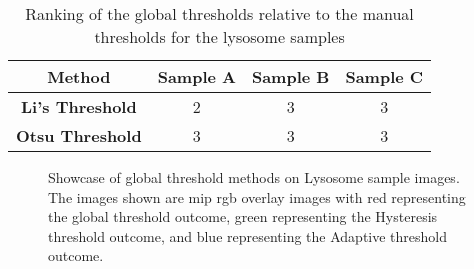 \begin{table}
    \centering
    \begin{tabular}{|c|c|c|c|} \hline 
         \textbf{Method}&  \textbf{Sample A}&  \textbf{Sample B}& \textbf{Sample C}\\ \hline 
         \textbf{Li's Threshold}&  2&  3& 3\\ \hline 
         \textbf{Otsu Threshold}&  3&  3& 3\\ \hline
    \end{tabular}
    \caption{Ranking of the global thresholds relative to the manual thresholds for the lysosome samples}
    \label{tab:global_lyso_rankings}
\end{table}
\begin{figure}[h!]
    \centering
    \caption[Showcase of global threshold methods on Lysosome sample images]{Showcase of global threshold methods on Lysosome sample images. The images shown are \gls{mip} \gls{rgb} overlay images with red representing the global threshold outcome, green representing the Hysteresis threshold outcome, and blue representing the Adaptive threshold outcome.}
    \label{fig:lyso_global_outcomes}
\end{figure}
